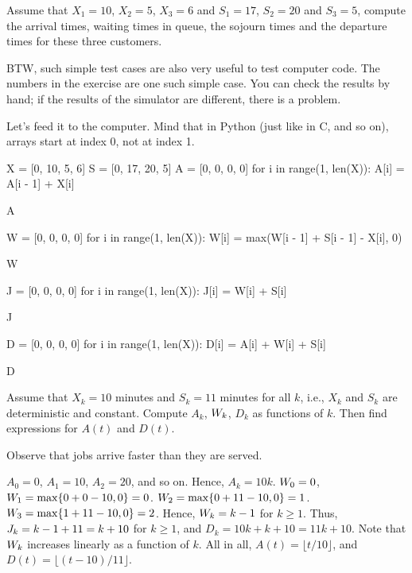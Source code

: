 \begin{exercise}\label{ex:82}
 Assume  that $X_1=10$, $X_2=5$, $X_3=6$ and $S_1 = 17$, $S_2=20$ and $S_3=5$, compute the arrival times, waiting times in queue, the sojourn times and the departure times for these three customers.
\begin{hint}
 BTW, such simple test cases are also very useful to test computer code.
 The numbers in the exercise are one such simple case.
 You can check the results by hand; if the results of the simulator are different, there is a problem.
\end{hint}
\begin{solution} Let's feed it to the computer. Mind that in Python (just like in C, and so on), arrays start at index 0, not at index 1.
\begin{pyconsole}
X = [0, 10, 5, 6]
S = [0, 17, 20, 5]
A = [0, 0, 0, 0]
for i in range(1, len(X)):
    A[i] = A[i - 1] + X[i]

A

W = [0, 0, 0, 0]
for i in range(1, len(X)):
    W[i] = max(W[i - 1] + S[i - 1] - X[i], 0)

W

J = [0, 0, 0, 0]
for i in range(1, len(X)):
    J[i] = W[i] + S[i]

J

D = [0, 0, 0, 0]
for i in range(1, len(X)):
    D[i] = A[i] + W[i] + S[i]

D
\end{pyconsole}

\end{solution}
\end{exercise}



\begin{exercise}\label{ex:25}
Assume that $X_k = 10$ minutes and $S_k = 11$ minutes for all $k$, i.e., $X_k$ and $S_k$ are deterministic and constant.
Compute $A_k$, $W_k$, $D_k$ as functions of $k$.
Then find expressions for $A(t)$ and $D(t)$.
\begin{hint}
Observe that jobs arrive faster than they are served.
\end{hint}
\begin{solution}
$A_0 = 0$, $A_1=10$, $A_2=20$, and so on. Hence,
 $A_k = 10k$. $W_{0} = 0$, $W_{1} = \max\{0 + 0-10,0\} = 0$.
 $W_{2} = \max\{0+11-10,0\} =1$.
 $W_{3} = \max\{1+11-10,0\} =2$. Hence, $W_{k} = k-1$ for
 $k\geq1$. Thus, $J_k = k-1+11 = k + 10$ for $k\geq1$, and
 $D_k = 10k + k+10 = 11k+10$. Note that $W_k$ increases linearly
 as a function of $k$. All in all, $A(t) = \lfloor t/10\rfloor$, and $D(t) = \lfloor (t-10)/11 \rfloor$.
\end{solution}
\end{exercise}



